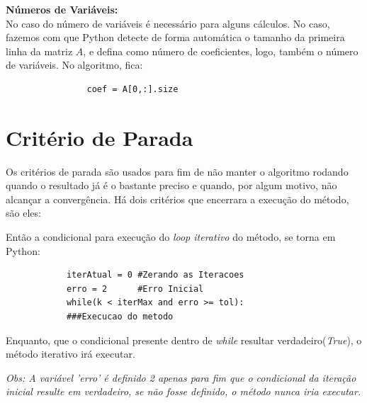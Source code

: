 \documentclass[
12pt,				%
openright,			%
twoside,			%
a4paper,			%
english,			%
french,				%
spanish,			%
brazil				%
]{abntex2_new}
\begin{document}
\begin{alineas}
{			}
			
			\item{\textbf{Números de Variáveis:}\\
				No caso do número de variáveis é necessário para alguns cálculos. No caso,
				fazemos 
				com que Python detecte de forma automática o tamanho da primeira linha da matriz
				$A$, 
				e defina como número de coeficientes, logo, também o número de variáveis. No
				algoritmo, fica:
				\begin{lstlisting}
				coef = A[0,:].size\end{lstlisting}
			}
			

			
		\end{alineas}
		\section{Critério de Parada}
		\begin{alineas}
			\item{
			Os critérios de parada são usados para fim de não manter o algoritmo rodando
			quando o 
			resultado já é o bastante preciso e quando, por algum motivo, não alcançar a
			convergência.
			Há dois critérios que encerrara a execução do método, são eles:
			
			Então a condicional para execução do \textit{loop iterativo} do método, se torna
			em Python:
			
			
			\begin{lstlisting}
			iterAtual = 0 #Zerando as Iteracoes
			erro = 2      #Erro Inicial
			while(k < iterMax and erro >= tol):
			###Execucao do metodo
			\end{lstlisting}
			
			Enquanto, que o condicional presente dentro de \textit{while} resultar
			verdadeiro(\textit{True}), o método iterativo irá executar.
			
			\textit{Obs: A variável 'erro' é definido 2 apenas para fim que o condicional da
				iteração inicial resulte em verdadeiro, se não fosse definido, o método nunca
				iria executar.}
			
			
			
			
		}
		
		\end{alineas}
\end{document}
